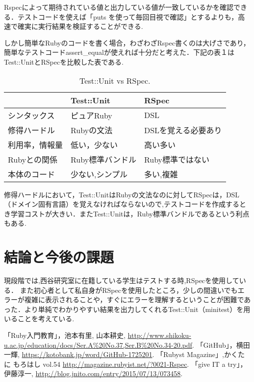 \documentclass[a4j,twocolumn,uplatex]{jsarticle}
\begin{document}
Rspecによって期待されている値と出力している値が一致しているかを確認できる．テストコードを使えば「puts を使って毎回目視で確認」とするよりも，高速で確実に実行結果を検証することができる.

しかし簡単なRubyのコードを書く場合，わざわざRspec書くのは大げさであり，簡単なテストコードassert\_equalが使えれば十分だと考えた．下記の表１はTest::UnitとRSpecを比較した表である.

\begin{table}[htb]
  \begin{center}
   \caption{Test::Unit vs RSpec.}
   \begin{tabular}{|l||l|l|} \hline
        & Test::Unit  &  RSpec  \\
    \hline \hline
    シンタックス  & ピュアRuby  & DSL \\
    修得ハードル  & Rubyの文法   &  DSLを覚える必要あり\\
    利用率，情報量&低い，少ない&高い多い\\
    Rubyとの関係 & Ruby標準バンドル& Ruby標準ではない\\
    本体のコード&少ない,シンプル&多い,複雑\\
    \hline
  \end{tabular}
  \end{center}
\end{table}

修得ハードルにおいて，Test::UnitはRubyの文法なのに対してRSpecは，DSL（ドメイン固有言語）を覚えなければならないので,テストコードを作成するとき学習コストが大きい．またTest::Unitは，Ruby標準バンドルであるという利点もある\cite{4}.
\section{結論と今後の課題}
現段階では,西谷研究室に在籍している学生はテストする時,RSpecを使用している．
また初心者として私自身がRSpecを使用したところ，少しの間違いでもエラーが複雑に表示されることや，すぐにエラーを理解するということが困難であった．より単純でわかりやすい結果を出力してくれるTest::Unit（minitest）を用いることを考えている.

\begin{flushleft}
\begin{thebibliography}{9}
「Ruby入門教育」，池本有里, 山本耕史, \url{http://www.shikoku-u.ac.jp/education/docs/Ser.A%20No.37,Ser.B%20No.34-20.pdf}.
 「GitHub」，横田一輝, \url{https://kotobank.jp/word/GitHub-1725201}.
 「Rubyst Magazine」,かくたに もろはし vol.54 \url{http://magazine.rubyist.net/?0021-Rspec}.
 「give IT a try」，伊藤淳一, \url{http://blog.jnito.com/entry/2015/07/13/073458}.
\end{thebibliography}
\end{flushleft}
\end{document}

